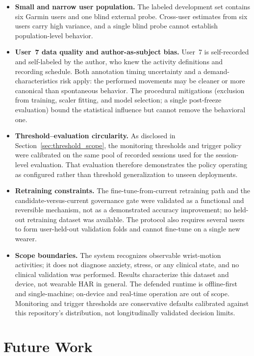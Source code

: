 \begin{itemize}
\item \textbf{Small and narrow user population.} The labeled development set contains six Garmin users and one blind external probe. Cross-user estimates from six users carry high variance, and a single blind probe cannot establish population-level behavior.
\item \textbf{User~7 data quality and author-as-subject bias.} User~7 is self-recorded and self-labeled by the author, who knew the activity definitions and recording schedule. Both annotation timing uncertainty and a demand-characteristics risk apply: the performed movements may be cleaner or more canonical than spontaneous behavior. The procedural mitigations (exclusion from training, scaler fitting, and model selection; a single post-freeze evaluation) bound the statistical influence but cannot remove the behavioral one.
\item \textbf{Threshold--evaluation circularity.} As disclosed in Section~\ref{sec:threshold_scope}, the monitoring thresholds and trigger policy were calibrated on the same pool of recorded sessions used for the session-level evaluation. That evaluation therefore demonstrates the policy operating as configured rather than threshold generalization to unseen deployments.
\item \textbf{Retraining constraints.} The fine-tune-from-current retraining path and the candidate-versus-current governance gate were validated as a functional and reversible mechanism, not as a demonstrated accuracy improvement; no held-out retraining dataset was available. The protocol also requires several users to form user-held-out validation folds and cannot fine-tune on a single new wearer.
\item \textbf{Scope boundaries.} The system recognizes observable wrist-motion activities; it does not diagnose anxiety, stress, or any clinical state, and no clinical validation was performed. Results characterize this dataset and device, not wearable HAR in general. The defended runtime is offline-first and single-machine; on-device and real-time operation are out of scope. Monitoring and trigger thresholds are conservative defaults calibrated against this repository's distribution, not longitudinally validated decision limits.
\end{itemize}

\section{Future Work}
\label{sec:future_work}

